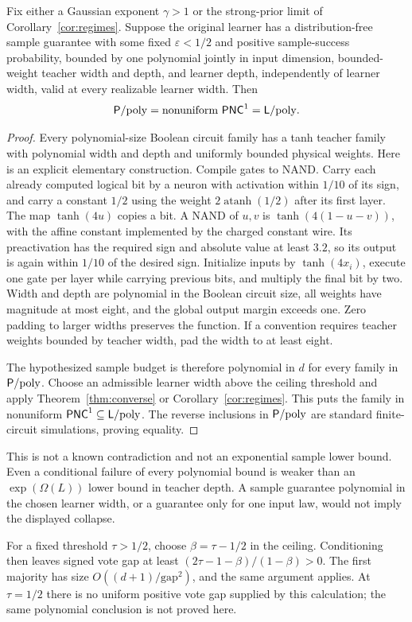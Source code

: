 \begin{corollary}
\label{cor:collapse}
Fix either a Gaussian exponent $\gamma>1$ or the strong-prior limit
of Corollary~\ref{cor:regimes}. Suppose the original learner has a
distribution-free sample guarantee with some fixed
$\varepsilon<1/2$ and positive sample-success probability, bounded
by one polynomial jointly in input dimension, bounded-weight teacher
width and depth, and learner depth, independently of learner width,
valid at every realizable learner width. Then
\[
 \mathsf P/\mathrm{poly}=\text{nonuniform }\mathsf{PNC}^1=\mathsf L/\mathrm{poly}.
\]
\end{corollary}
\begin{proof}
Every polynomial-size Boolean circuit family has a tanh teacher
family with polynomial width and depth and uniformly bounded physical
weights. Here is an explicit elementary construction. Compile gates
to NAND. Carry each already computed logical bit by a neuron with
activation within $1/10$ of its sign, and carry a constant $1/2$
using the weight $2\operatorname{atanh}(1/2)$ after its first layer.
The map $\tanh(4u)$ copies a bit. A NAND of $u,v$ is
$\tanh(4(1-u-v))$, with the affine constant implemented by the
charged constant wire. Its preactivation has the required sign and
absolute value at least $3.2$, so its output is again within $1/10$
of the desired sign. Initialize inputs by $\tanh(4x_i)$, execute
one gate per layer while carrying previous bits, and multiply the
final bit by two. Width and depth are polynomial in the Boolean
circuit size, all weights have magnitude at most eight, and the
global output margin exceeds one. Zero padding to larger widths
preserves the function. If a convention requires teacher weights
bounded by teacher width, pad the width to at least eight.

The hypothesized sample budget is therefore polynomial in $d$ for
every family in $\mathsf P/\mathrm{poly}$. Choose an admissible learner width above
the ceiling threshold and apply Theorem~\ref{thm:converse} or
Corollary~\ref{cor:regimes}. This puts the family in nonuniform
$\mathsf{PNC}^1\subseteq\mathsf L/\mathrm{poly}$. The reverse inclusions in $\mathsf P/\mathrm{poly}$
are standard finite-circuit simulations, proving equality.
\end{proof}

This is not a known contradiction and not an exponential sample lower
bound. Even a conditional failure of every polynomial bound is weaker
than an $\exp(\Omega(L))$ lower bound in teacher depth. A sample
guarantee polynomial in the chosen learner width, or a guarantee only
for one input law, would not imply the displayed collapse.

\begin{remark}
For a fixed threshold $\tau>1/2$, choose
$\beta=\tau-1/2$ in the ceiling. Conditioning then leaves signed
vote gap at least
$(2\tau-1-\beta)/(1-\beta)>0$. The first majority has size
$O((d+1)/\mathrm{gap}^2)$, and the same argument applies. At
$\tau=1/2$ there is no uniform positive vote gap supplied by this
calculation; the same polynomial conclusion is not proved here.
\end{remark}
